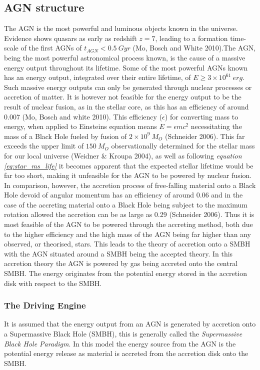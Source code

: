 \documentclass[a4paper, 12pt, twoside]{article}
\begin{document}
\subsection{AGN structure}
The AGN is the most powerful and luminous objects known in the universe. Evidence shows quasars as early as redshift $z=7$, leading to a formation time-scale of the first AGNs of $t_{AGN}<0.5\ Gyr$ (Mo, Bosch and White 2010).The AGN, being the most powerful astronomical process known, is the cause of a massive energy output throughout its lifetime. Some of the most powerful AGNs known has an energy output, integrated over their entire lifetime, of $E\geq 3\times 10^{61}\ erg$. Such massive energy outputs can only be generated through nuclear processes or accretion of matter. It is however not feasible for the energy output to be the result of nuclear fusion, as in the stellar core, as this has an efficiency of around 0.007 (Mo, Bosch and white 2010). This efficiency ($\epsilon$) for converting mass to energy, when applied to Einsteins equation means $E=\epsilon mc^{2}$ necessitating the mass of a Black Hole fueled by fusion of $2\times 10^{9}\ M_{O}$ (Schneider 2006). This far exceeds the upper limit of $150\ M_{O}$ observationally determined for the stellar mass for our local universe (Weidner \& Kroupa 2004), as well as following \emph{equation \ref{eq:star_ms_life}} it becomes apparent that the expected stellar lifetime would be far too short, making it unfeasible for the AGN to be powered by nuclear fusion. In comparison, however, the accretion process of free-falling material onto a Black Hole devoid of angular momentum has an efficiency of around 0.06 and in the case of the accreting material onto a Black Hole being subject to the maximum rotation allowed the accretion can be as large as 0.29 (Schneider 2006). Thus it is most feasible of the AGN to be powered through the accreting method, both due to the higher efficiency and the high mass of the AGN being far higher than any observed, or theorised, stars. This leads to the theory of accretion onto a SMBH with the AGN situated around a SMBH being the accepted theory. In this accretion theory the AGN is powered by gas being accreted onto the central SMBH. The energy originates from the potential energy stored in the accretion disk with respect to the SMBH. 

\subsubsection{The Driving Engine}
It is assumed that the energy output from an AGN is generated by accretion onto a Supermassive Black Hole (SMBH), this is generally called the \emph{Supermassive Black Hole Paradigm}. In this model the energy source from the AGN is the potential energy release as material is accreted from the accretion disk onto the SMBH. \\
\\
\end{document}
